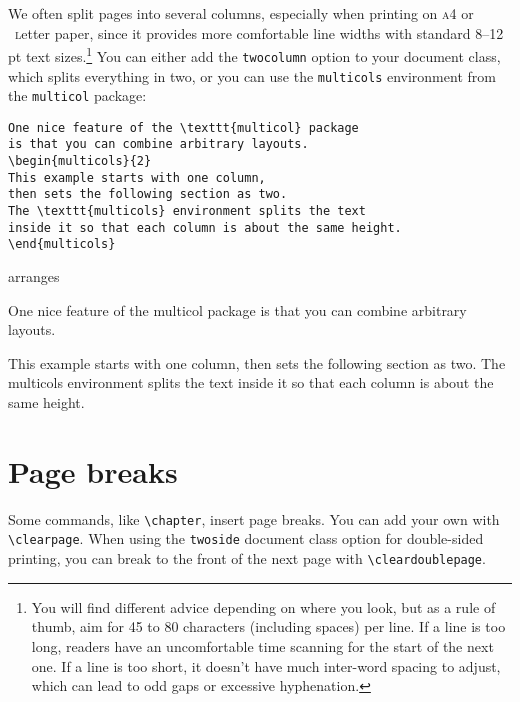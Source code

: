 We often split pages into several columns, especially when printing on
\textsc{a4} or ~\textsc{l}etter paper,
since it provides more comfortable line widths with standard
8--12\,pt text sizes.\punckern\footnote{You will find different advice depending
on where you look, but as a rule of thumb,
aim for 45 to 80 characters (including spaces) per line.
If a line is too long, readers have an uncomfortable time scanning for
the start of the next one.
If a line is too short, it doesn't have much inter-word spacing to adjust,
which can lead to odd gaps or excessive hyphenation.}
You can either add the \texttt{twocolumn} option to your document class,
which splits everything in two, or you can use the \texttt{multicols}
environment from the \texttt{multicol} package:
\begin{leftfigure}
\begin{lstlisting}
One nice feature of the \texttt{multicol} package
is that you can combine arbitrary layouts.
\begin{multicols}{2}
This example starts with one column,
then sets the following section as two.
The \texttt{multicols} environment splits the text
inside it so that each column is about the same height.
\end{multicols}
\end{lstlisting}
\end{leftfigure}
arranges
\begin{leftfigure}
\lm%
One nice feature of the {\lt multicol} package
is that you can combine arbitrary layouts.
\begin{multicols}{2}
This example starts with one column,
then sets the following section as two.
The \mbox{\lt multicols} environment splits the text
inside it so that each column is about the same height.
\end{multicols}
\end{leftfigure}

\section{Page breaks}

Some commands, like \verb|\chapter|, insert page breaks.
You can add your own with \verb|\clearpage|.
When using the \texttt{twoside} document class option for double-sided
printing, you can break to the front of the next page with
\verb|\cleardoublepage|.

